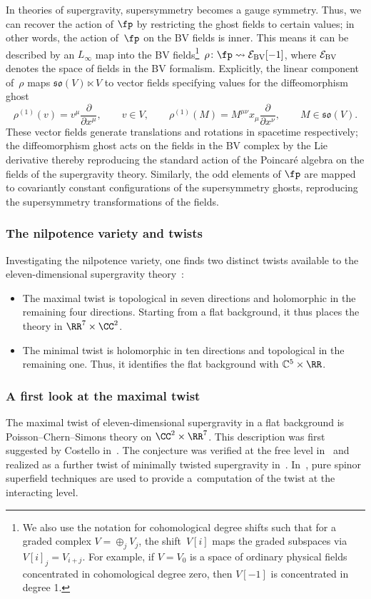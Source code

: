 \documentclass[10pt,a4paper]{amsart}
\numberwithin{equation}{section}
\theoremstyle{definition}
\def\C{\mathbb{C}}
\def\lie#1{\ensuremath{\mathfrak{#1}}}
\def\so{\lie{so}}
\begin{document}
In theories of supergravity, supersymmetry becomes a gauge symmetry. Thus, we can recover the action of $\fp$ by restricting the ghost fields to certain values; in other words, the action of~$\fp$ on the BV fields is inner.
This means it can be described by an $L_\infty$ map into the BV fields\footnote{We also use the notation for cohomological degree shifts such that for a graded complex $V = \oplus_j V_j$, the shift~$V[i]$ maps the graded subspaces via $V[i]_j = V_{i + j}$. For example, if $V = V_0$ is a space of ordinary physical fields concentrated in cohomological degree zero, then $V[-1]$ is concentrated in degree 1.}~${
 \rho \colon \fp \rightsquigarrow \mathcal{E}_{\rm BV} [-1]}$,
where $\mathcal{E}_{\rm BV}$ denotes the space of fields in the BV formalism.
Explicitly, the linear component of~$\rho$ maps $\so(V) \ltimes V$ to vector fields specifying values for the diffeomorphism ghost
\[
 \rho^{(1)}(v) = v^\mu \frac{\partial}{\partial x^\mu}, \qquad v \in V ,\qquad
 \rho^{(1)}(M) = M^{\mu \nu} x_\mu \frac{\partial}{\partial x^\nu} ,\qquad M \in \so(V).
\]
These vector fields generate translations and rotations in spacetime respectively; the diffeomorphism ghost acts on the fields in the BV complex by the Lie derivative thereby reproducing the standard action of the Poincar\'e algebra on the fields of the supergravity theory. Similarly, the odd elements of $\fp$ are mapped to covariantly constant configurations of the supersymmetry ghosts, reproducing the supersymmetry transformations of the fields.

\subsubsection{The nilpotence variety and twists}
Investigating the nilpotence variety, one finds two distinct twists available to the eleven-dimen\-sion\-al supergravity theory~\cite{NV}:
\begin{itemize}\itemsep=0pt
 \item[--] The maximal twist is topological in seven directions and holomorphic in the remaining four directions. Starting from a flat background, it thus places the theory in $\RR^7 \times \CC^2$.
 \item[--] The minimal twist is holomorphic in ten directions and topological in the remaining one. Thus, it identifies the flat background with $\C^5 \times \RR$.
\end{itemize}

\subsubsection{A first look at the maximal twist}\label{p: first-max}
The maximal twist of eleven-dimensional supergravity in a flat background is Poisson--Chern--Simons theory on $\CC^2 \times \RR^7$. This description was first suggested by Costello in~\cite{CostelloMtheory2}. The conjecture was verified at the free level in~\cite{MaxTwist} and realized as a further twist of minimally twisted supergravity in~\cite{RSW}. In~\cite{CY2}, pure spinor superfield techniques are used to provide a~computation of the twist at the interacting level.
\end{document}
